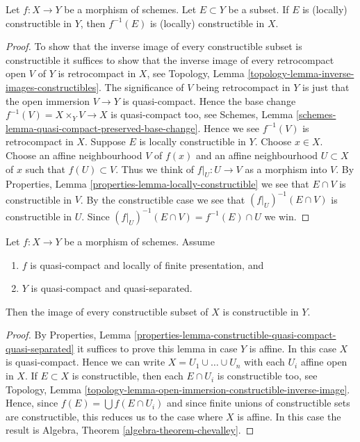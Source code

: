 \begin{lemma}
\label{lemma-inverse-image-constructible}
Let $f : X \to Y$ be a morphism of schemes.
Let $E \subset Y$ be a subset.
If $E$ is (locally) constructible in $Y$, then $f^{-1}(E)$ is (locally)
constructible in $X$.
\end{lemma}

\begin{proof}
To show that the inverse image of every constructible subset is constructible
it suffices to show that the inverse image of every retrocompact open $V$
of $Y$ is retrocompact in $X$, see
Topology, Lemma \ref{topology-lemma-inverse-images-constructibles}.
The significance of $V$ being retrocompact
in $Y$ is just that the open immersion $V \to Y$ is quasi-compact.
Hence the base change $f^{-1}(V) = X \times_Y V \to X$ is quasi-compact
too, see
Schemes, Lemma \ref{schemes-lemma-quasi-compact-preserved-base-change}.
Hence we see $f^{-1}(V)$ is retrocompact in $X$.
Suppose $E$ is locally constructible in $Y$.
Choose $x \in X$. Choose an affine neighbourhood $V$ of $f(x)$ and
an affine neighbourhood $U \subset X$ of $x$ such that $f(U) \subset V$.
Thus we think of $f|_U : U \to V$ as a morphism into $V$. By
Properties, Lemma \ref{properties-lemma-locally-constructible}
we see that $E \cap V$ is constructible in $V$. By the constructible case
we see that $(f|_U)^{-1}(E \cap V)$ is constructible in $U$.
Since $(f|_U)^{-1}(E \cap V) = f^{-1}(E) \cap U$ we win.
\end{proof}

\begin{lemma}
\label{lemma-chevalley}
Let $f : X \to Y$ be a morphism of schemes.
Assume
\begin{enumerate}
\item $f$ is quasi-compact and locally of finite presentation, and
\item $Y$ is quasi-compact and quasi-separated.
\end{enumerate}
Then the image of every constructible subset of $X$ is constructible in $Y$.
\end{lemma}

\begin{proof}
By
Properties,
Lemma \ref{properties-lemma-constructible-quasi-compact-quasi-separated}
it suffices to prove this lemma in case $Y$ is affine.
In this case $X$ is quasi-compact. Hence we can write
$X = U_1 \cup \ldots \cup U_n$ with each $U_i$ affine open in $X$.
If $E \subset X$ is constructible, then each $E \cap U_i$ is constructible
too, see
Topology,
Lemma \ref{topology-lemma-open-immersion-constructible-inverse-image}.
Hence, since $f(E) = \bigcup f(E \cap U_i)$ and since finite unions of
constructible sets are constructible, this reduces us to the case where
$X$ is affine. In this case the result is
Algebra, Theorem \ref{algebra-theorem-chevalley}.
\end{proof}


